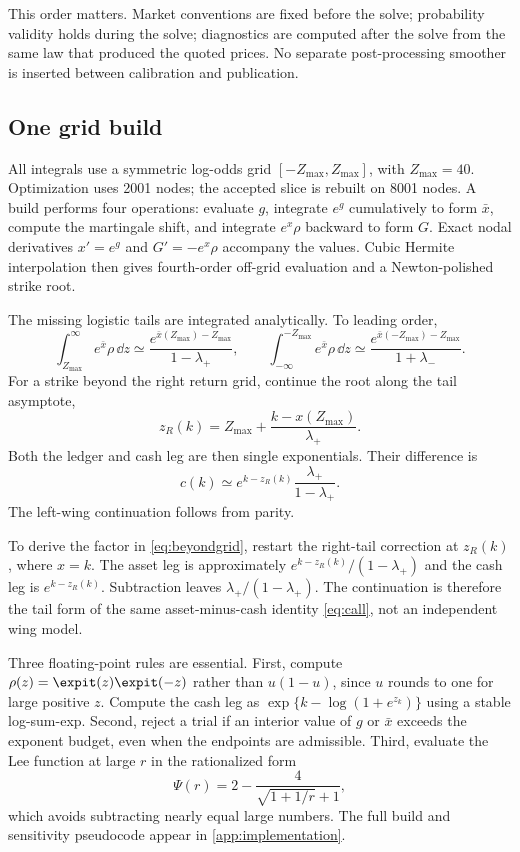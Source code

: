 This order matters.  Market conventions are fixed before the solve;
probability validity holds during the solve; diagnostics are computed after
the solve from the same law that produced the quoted prices.  No separate
post-processing smoother is inserted between calibration and publication.

\subsection{One grid build}

All integrals use a symmetric log-odds grid
$[-Z_{\max},Z_{\max}]$, with $Z_{\max}=40$.  Optimization uses 2001 nodes;
the accepted slice is rebuilt on 8001 nodes.  A build performs four operations:
evaluate $g$, integrate $e^g$ cumulatively to form $\bar x$, compute the
martingale shift, and integrate $e^x\rho$ backward to form $G$.  Exact nodal
derivatives $x'=e^g$ and $G'=-e^x\rho$ accompany the values.  Cubic Hermite
interpolation then gives fourth-order off-grid evaluation and a
Newton-polished strike root.

The missing logistic tails are integrated analytically.  To leading order,
\begin{equation}
\int_{Z_{\max}}^\infty e^{\bar x}\rho\,\dd z
\simeq\frac{e^{\bar x(Z_{\max})-Z_{\max}}}{1-\lambda_+},
\qquad
\int_{-\infty}^{-Z_{\max}}e^{\bar x}\rho\,\dd z
\simeq\frac{e^{\bar x(-Z_{\max})-Z_{\max}}}{1+\lambda_-}.
\label{eq:tailcorr}
\end{equation}
For a strike beyond the right return grid, continue the root along the tail
asymptote,
\[
z_R(k)=Z_{\max}+\frac{k-x(Z_{\max})}{\lambda_+}.
\]
Both the ledger and cash leg are then single exponentials.  Their difference
is
\begin{equation}
c(k)\simeq e^{k-z_R(k)}\frac{\lambda_+}{1-\lambda_+}.
\label{eq:beyondgrid}
\end{equation}
The left-wing continuation follows from parity.

To derive the factor in \eqref{eq:beyondgrid}, restart the right-tail
correction at $z_R(k)$, where $x=k$.  The asset leg is approximately
$e^{k-z_R(k)}/(1-\lambda_+)$ and the cash leg is $e^{k-z_R(k)}$.
Subtraction leaves $\lambda_+/(1-\lambda_+)$.  The continuation is therefore
the tail form of the same asset-minus-cash identity \eqref{eq:call}, not an
independent wing model.

Three floating-point rules are essential.  First, compute
$\rho(z)=\expit(z)\expit(-z)$ rather than $u(1-u)$, since $u$ rounds to one
for large positive $z$.  Compute the cash leg as
$\exp\{k-\log(1+e^{z_k})\}$ using a stable log-sum-exp.  Second, reject a
trial if an interior value of $g$ or $\bar x$ exceeds the exponent budget,
even when the endpoints are admissible.  Third, evaluate the Lee function at
large $r$ in the rationalized form
\begin{equation}
\Psi(r)=2-\frac4{\sqrt{1+1/r}+1},
\label{eq:leestable}
\end{equation}
which avoids subtracting nearly equal large numbers.  The full build and
sensitivity pseudocode appear in \cref{app:implementation}.

